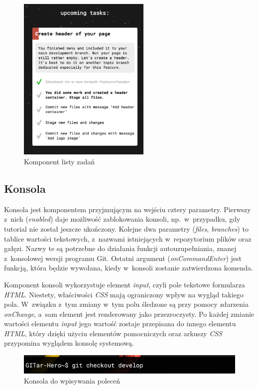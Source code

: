 \documentclass[12pt,a4paper,polish,thesis]{dcsbook}
\begin{document}
{	\begin{figure}[h]
		\centering
		\includegraphics[height=8cm]{component-task-list}
		\caption{Komponent listy zadań}
		\label{fig:task-list}
	\end{figure}

	\subsection{Konsola}

	Konsola jest komponentem przyjmującym na wejściu cztery parametry. Pierwszy z~nich (\textit{enabled}) daje możliwość zablokowania konsoli, np.~w~przypadku, gdy tutorial nie został jeszcze ukończony. Kolejne dwa parametry (\textit{files}, \textit{branches}) to tablice wartości tekstowych, z~nazwami istniejących w~repozytorium plików oraz gałęzi. Nazwy te są potrzebne do działania funkcji autouzupełniania, znanej z~konsolowej wersji programu Git. Ostatni argument (\textit{onCommandEnter}) jest funkcją, która będzie wywołana, kiedy w~konsoli zostanie zatwierdzona komenda.

	Komponent konsoli wykorzystuje element \textit{input}, czyli pole tekstowe formularza \textit{HTML}. Niestety, właściwości \textit{CSS} mają ograniczony wpływ na wygląd takiego pola. W~związku z~tym zmiany w~tym polu śledzone są przy pomocy zdarzenia \textit{onChange}, a~sam element jest renderowany jako przezroczysty. Po każdej zmianie wartości elementu \textit{input} jego wartość zostaje przepisana do innego elementu \textit{HTML}, który dzięki użyciu elementów pomocniczych oraz arkuszy \textit{CSS} przypomina wyglądem konsolę systemową.

	\begin{figure}[h]
		\centering
		\includegraphics[width=15cm]{component-console}
		\caption{Konsola do wpisywania poleceń}
		\label{fig:console}
	\end{figure}

}
\end{document}
